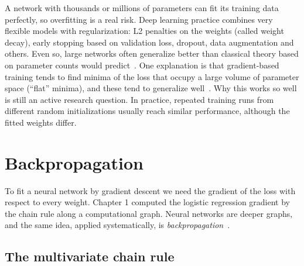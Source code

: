 A network with thousands or millions of parameters can fit its training data perfectly, so overfitting is a real risk. Deep learning practice combines very flexible models with regularization: L2 penalties on the weights (called weight decay), early stopping based on validation loss, dropout, data augmentation and others. Even so, large networks often generalize better than classical theory based on parameter counts would predict~\citep{zhang2017}. One explanation is that gradient-based training tends to find minima of the loss that occupy a large volume of parameter space (``flat'' minima), and these tend to generalize well~\citep{hochreiter1997}. Why this works so well is still an active research question. In practice, repeated training runs from different random initializations usually reach similar performance, although the fitted weights differ.

\section{Backpropagation}
\label{sec:backprop}

To fit a neural network by gradient descent we need the gradient of the loss with respect to every weight. Chapter 1 computed the logistic regression gradient by the chain rule along a computational graph. Neural networks are deeper graphs, and the same idea, applied systematically, is \emph{backpropagation}~\citep{rumelhart1986}.

\subsection{The multivariate chain rule}

